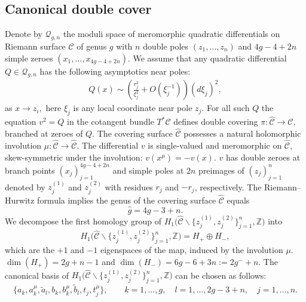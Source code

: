\documentclass[pdftex]{sigma}
\numberwithin{equation}{section}
\theoremstyle{definition}
\newcommand{\Z}{\mathbb{Z}}
\begin{document}
\subsection{Canonical double cover}

Denote by $\mathcal{Q}_{g,n}$ the moduli space of meromorphic quadratic differentials on Riemann surface $\mathcal{C}$ of genus $g$ with $n$ double poles $(z_1, \dots, z_n)$ and $4g-4+2n$ simple zeroes $(x_1,\dots,x_{4g-4+2n})$. We assume that any quadratic differential $Q \in \mathcal{Q}_{g,n}$ has the following asymptotics near poles:
\begin{gather*}%
Q(x) \sim \left(\frac{r_j^2}{\xi_j^2} +O(\xi_j^{-1})\right)(d \xi_j)^2,
\end{gather*}
as $x \xrightarrow{} z_i,$ here $\xi_j$ is any local coordinate near pole $z_j$.
For all such $Q$ the equation $v^2=Q$ in the cotangent bundle $T^*\mathcal{C}$ defines double covering
$\pi\colon \hat{\mathcal{C}}\xrightarrow{}\mathcal{C},$ branched at zeroes of $Q.$ The covering surface $\hat{\mathcal{C}}$ possesses a natural holomorphic involution $\mu\colon \hat{\mathcal{C}} \xrightarrow{}\hat{\mathcal{C}}.$ The differential $v$ is single-valued and meromorphic on $\hat{\mathcal{C}}$, skew-symmetric under the involution: $v(x^{\mu})=-v(x)$. $v$ has double zeroes at branch points $(x_j)^{4g-4+2n}_{j=1}$ and simple poles at $2n$ preimages of $(z_j)^{n}_{j=1}$ denoted by $z^{(1)}_j$ and $z^{(2)}_j$ with residues $r_j$ and $-r_j$, respectively. The Riemann--Hurwitz formula implies the genus of the covering surface $\hat{\mathcal{C}}$ equals
\begin{equation*}%
\hat{g}=4g-3+n.
\end{equation*}
We decompose the first homology group of $H_1\big(\hat{\mathcal{C}}\backslash \big\{z^{(1)}_j, z^{(2)}_j \big\}^n_{j=1}, \Z \big)$ into
 \begin{equation*}%
 H_1\big(\hat{\mathcal{C}}\backslash \big\{z^{(1)}_j, z^{(2)}_j \big\}^n_{j=1}, \Z \big)=H_+ \oplus H_- ,
 \end{equation*}
which are the $+1$ and $-1$ eigenspaces of the map, induced by the involution $\mu.$ $\dim(H_+)=2g+n-1$ and $\dim(H_-)=6g-6+3n:=2g^-+n $.
The canonical basis of $H_1\big(\hat{\mathcal{C}}\backslash \big\{z^{(1)}_j, z^{(2)}_j \big\}^n_{j=1}, \Z \big)$ can be chosen as follows:
\begin{equation*}%
\big\{a_k, a^\mu_k, \tilde{a}_l, b_k, b^\mu_k, \tilde{b}_l, t_j, t^\mu_j \big\}, \qquad k=1,\dots,g, \quad l=1,\dots,2g-3+n, \quad j=1,\dots,n.
\end{equation*}
\end{document}
